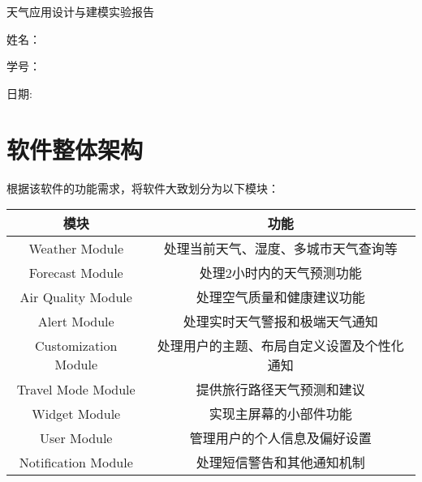\documentclass[UTF8]{ctexart}
\begin{document}
\begin{titlepage}
        \heiti
        \vspace*{64pt}
        \begin{center}
           
            \fontsize{24pt}{24pt} {天气应用设计与建模实验报告} \\
	\vspace*{24pt}   
            \vspace*{48pt}
            \vspace*{48pt}
        
            \vspace*{72pt}
        
	   \Large  姓名：\ \ \underline{}

	   \Large  学号：\ \ \underline{}

	\vspace*{48pt}
	 \Large 日期:\ \ \underline{}

        \end{center}
    \end{titlepage}
\newpage

\section{软件整体架构}

根据该软件的功能需求，将软件大致划分为以下模块：

\begin{center}
\begin{tabular}{| c| c|  }
\hline
模块 & 功能  \\ 
\hline\hline
 Weather Module & 处理当前天气、湿度、多城市天气查询等 \\  
\hline 
Forecast Module & 处理2小时内的天气预测功能 \\
\hline
Air Quality Module & 处理空气质量和健康建议功能  \\
\hline
Alert Module & 处理实时天气警报和极端天气通知 \\
\hline
Customization Module & 处理用户的主题、布局自定义设置及个性化通知\\
\hline
Travel Mode Module &  提供旅行路径天气预测和建议\\
\hline
Widget Module & 实现主屏幕的小部件功能\\
\hline
User Module & 管理用户的个人信息及偏好设置\\
\hline
Notification Module & 处理短信警告和其他通知机制 \\
\hline
\end{tabular}
\end{center}
\end{document}
